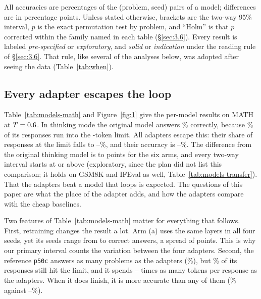 \documentclass[11pt]{article}
\begin{document}
All accuracies are percentages of the \NPairs{} (problem, seed) pairs of a model; differences are in percentage points. Unless stated otherwise, brackets are the two-way 95\% interval, $p$ is the exact permutation test by problem, and ``Holm'' is that $p$ corrected within the family named in each table (\S\ref{sec:3.6}). Every result is labeled \emph{pre-specified} or \emph{exploratory}, and \emph{solid} or \emph{indication} under the reading rule of \S\ref{sec:3.6}. That rule, like several of the analyses below, was adopted after seeing the data (Table~\ref{tab:when}).

\subsection{Every adapter escapes the loop}\label{sec:4.1}

Table~\ref{tab:models-math} and Figure~\ref{fig:1} give the per-model results on MATH at $T=0.6$. In thinking mode the original model answers \% correctly, because \% of its responses run into the \MaxTokensEval{}-token limit. All \NLora{} adapters escape this: their share of responses at the limit falls to --\%, and their accuracy is --\%. The difference from the original thinking model is  to  points for the six arms, and every two-way interval starts at or above  (exploratory, since the plan did not list this comparison; it holds on GSM8K and IFEval as well, Table~\ref{tab:models-transfer}). That the adapters beat a model that loops is expected. The questions of this paper are what the place of the adapter adds, and how the adapters compare with the cheap baselines.

Two features of Table~\ref{tab:models-math} matter for everything that follows. First, retraining changes the result a lot. Arm (a) uses the same \NLayersFull{} layers in all four seeds, yet its seeds range from  to  correct answers, a spread of  points. This is why our primary interval counts the variation between the four adapters. Second, the reference \texttt{p50c} answers as many problems as the adapters (\%), but \% of its responses still hit the limit, and it spends -- times as many tokens per response as the adapters. When it does finish, it is more accurate than any of them (\% against --\%).
\end{document}
